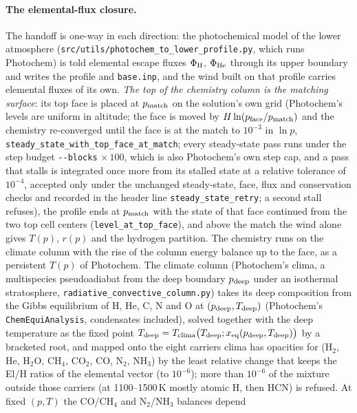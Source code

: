 \paragraph{The elemental-flux closure.} The handoff is one-way in each
direction: the photochemical model of the lower atmosphere
(\texttt{src/utils/photochem\_to\_lower\_profile.py}, which runs Photochem)
is told elemental escape fluxes $\Phi_{\rm H}$, $\Phi_{\rm He}$ through its
upper boundary and writes the profile and \texttt{base.inp}, and the wind
built on that profile carries elemental fluxes of its own. \emph{The top of
the chemistry column is the matching surface}: its top face is placed at
$p_{\rm match}$ on the solution's own grid (Photochem's levels are uniform in
altitude; the face is moved by $H\ln(p_{\rm face}/p_{\rm match})$ and the
chemistry re-converged until the face is at the match to $10^{-3}$ in $\ln p$,
\texttt{steady\_state\_with\_top\_face\_at\_match}; every steady-state
pass runs under the step budget \texttt{-{}-blocks}$\,\times100$, which is
also Photochem's own step cap, and a pass that stalls is integrated once more
from its stalled state at a relative tolerance of $10^{-4}$, accepted only
under the unchanged steady-state, face, flux and conservation checks and
recorded in the header line \texttt{steady\_state\_retry}; a second stall
refuses), the profile ends at
$p_{\rm match}$ with the state of that face continued from the two top cell
centers (\texttt{level\_at\_top\_face}), and above the match the wind alone
gives $T(p)$, $r(p)$ and the hydrogen partition. The chemistry runs on the
climate column with the rise of the column energy balance up to the face, as
a persistent $T(p)$ of Photochem. The climate column (Photochem's clima, a
multispecies pseudoadiabat from the deep boundary $p_{\rm deep}$ under an
isothermal stratosphere, \texttt{radiative\_convective\_column.py}) takes
its deep composition from the Gibbs equilibrium of H, He, C, N and O at
$(p_{\rm deep}, T_{\rm deep})$ (Photochem's \texttt{ChemEquiAnalysis},
condensates included), solved together with the deep temperature as the
fixed point $T_{\rm deep}=T_{\rm clima}\bigl(T_{\rm deep};
x_{\rm eq}(p_{\rm deep},T_{\rm deep})\bigr)$ by a bracketed root, and mapped
onto the eight carriers clima has opacities for (H$_2$, He, H$_2$O, CH$_4$,
CO$_2$, CO, N$_2$, NH$_3$) by the least relative change that keeps the El/H
ratios of the elemental vector (to $10^{-6}$); more than $10^{-6}$ of the
mixture outside those carriers (at 1100--1500\,K mostly atomic H, then HCN)
is refused. At fixed $(p,T)$ the CO/CH$_4$ and N$_2$/NH$_3$ balances depend
